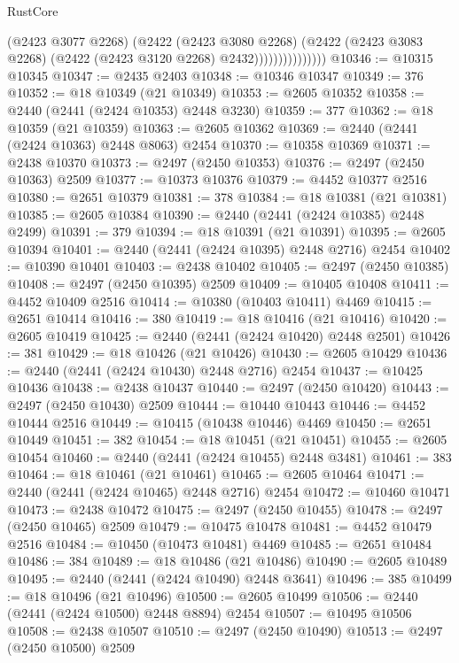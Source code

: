 \begin{lexlean}{RustCore}
\begin{coremodule}
                            (@2423 @3077 @2268)
                            (@2422
                              (@2423 @3080 @2268)
                              (@2422
                                (@2423 @3083 @2268)
                                (@2422 (@2423 @3120 @2268) @2432)))))))))))))))
@10346 := @10315 @10345
@10347 := @2435 @2403
@10348 := @10346 @10347
@10349 := 376
@10352 := @18 @10349 (@21 @10349)
@10353 := @2605 @10352
@10358 := @2440 (@2441 (@2424 @10353) @2448 @3230)
@10359 := 377
@10362 := @18 @10359 (@21 @10359)
@10363 := @2605 @10362
@10369 := @2440 (@2441 (@2424 @10363) @2448 @8063) @2454
@10370 := @10358 @10369
@10371 := @2438 @10370
@10373 := @2497 (@2450 @10353)
@10376 := @2497 (@2450 @10363) @2509
@10377 := @10373 @10376
@10379 := @4452 @10377 @2516
@10380 := @2651 @10379
@10381 := 378
@10384 := @18 @10381 (@21 @10381)
@10385 := @2605 @10384
@10390 := @2440 (@2441 (@2424 @10385) @2448 @2499)
@10391 := 379
@10394 := @18 @10391 (@21 @10391)
@10395 := @2605 @10394
@10401 := @2440 (@2441 (@2424 @10395) @2448 @2716) @2454
@10402 := @10390 @10401
@10403 := @2438 @10402
@10405 := @2497 (@2450 @10385)
@10408 := @2497 (@2450 @10395) @2509
@10409 := @10405 @10408
@10411 := @4452 @10409 @2516
@10414 := @10380 (@10403 @10411) @4469
@10415 := @2651 @10414
@10416 := 380
@10419 := @18 @10416 (@21 @10416)
@10420 := @2605 @10419
@10425 := @2440 (@2441 (@2424 @10420) @2448 @2501)
@10426 := 381
@10429 := @18 @10426 (@21 @10426)
@10430 := @2605 @10429
@10436 := @2440 (@2441 (@2424 @10430) @2448 @2716) @2454
@10437 := @10425 @10436
@10438 := @2438 @10437
@10440 := @2497 (@2450 @10420)
@10443 := @2497 (@2450 @10430) @2509
@10444 := @10440 @10443
@10446 := @4452 @10444 @2516
@10449 := @10415 (@10438 @10446) @4469
@10450 := @2651 @10449
@10451 := 382
@10454 := @18 @10451 (@21 @10451)
@10455 := @2605 @10454
@10460 := @2440 (@2441 (@2424 @10455) @2448 @3481)
@10461 := 383
@10464 := @18 @10461 (@21 @10461)
@10465 := @2605 @10464
@10471 := @2440 (@2441 (@2424 @10465) @2448 @2716) @2454
@10472 := @10460 @10471
@10473 := @2438 @10472
@10475 := @2497 (@2450 @10455)
@10478 := @2497 (@2450 @10465) @2509
@10479 := @10475 @10478
@10481 := @4452 @10479 @2516
@10484 := @10450 (@10473 @10481) @4469
@10485 := @2651 @10484
@10486 := 384
@10489 := @18 @10486 (@21 @10486)
@10490 := @2605 @10489
@10495 := @2440 (@2441 (@2424 @10490) @2448 @3641)
@10496 := 385
@10499 := @18 @10496 (@21 @10496)
@10500 := @2605 @10499
@10506 := @2440 (@2441 (@2424 @10500) @2448 @8894) @2454
@10507 := @10495 @10506
@10508 := @2438 @10507
@10510 := @2497 (@2450 @10490)
@10513 := @2497 (@2450 @10500) @2509

\end{coremodule}
\end{lexlean}
